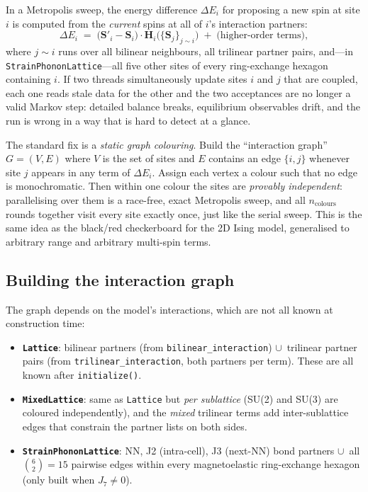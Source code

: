 \documentclass[11pt,letterpaper]{article}
\begin{document}
In a Metropolis sweep, the energy difference $\Delta E_i$ for proposing
a new spin at site $i$ is computed from the \emph{current} spins at all
of $i$'s interaction partners:
\[
\Delta E_i \;=\; \big(\mathbf{S}'_i - \mathbf{S}_i\big)\cdot
                 \mathbf{H}_i\big(\{\mathbf{S}_j\}_{j\sim i}\big)
              \;+\; \text{(higher-order terms)},
\]
where $j \sim i$ runs over all bilinear neighbours, all trilinear
partner pairs, and---in \texttt{StrainPhononLattice}---all five other
sites of every ring-exchange hexagon containing $i$.  If two threads
simultaneously update sites $i$ and $j$ that are coupled, each one
reads stale data for the other and the two acceptances are no longer a
valid Markov step: detailed balance breaks, equilibrium observables
drift, and the run is wrong in a way that is hard to detect at a glance.

The standard fix is a \emph{static graph colouring}.  Build the
``interaction graph'' $G = (V, E)$ where $V$ is the set of sites and
$E$ contains an edge $\{i, j\}$ whenever site $j$ appears in any term
of $\Delta E_i$.  Assign each vertex a colour such that no edge is
monochromatic.  Then within one colour the sites are \emph{provably
independent}: parallelising over them is a race-free, exact Metropolis
sweep, and all $n_{\text{colours}}$ rounds together visit every site
exactly once, just like the serial sweep.  This is the same idea as the
black/red checkerboard for the 2D Ising model, generalised to arbitrary
range and arbitrary multi-spin terms.

\subsection{Building the interaction graph}

The graph depends on the model's interactions, which are not all known
at construction time:

\begin{itemize}[noitemsep]
  \item \textbf{\texttt{Lattice}}:
        bilinear partners (from \texttt{bilinear\_interaction})
        $\cup$~trilinear partner pairs (from
        \texttt{trilinear\_interaction}, both partners per term).
        These are all known after \texttt{initialize()}.
  \item \textbf{\texttt{MixedLattice}}:
        same as \texttt{Lattice} but \emph{per sublattice}
        (SU(2) and SU(3) are coloured independently), and the
        \emph{mixed} trilinear terms add inter-sublattice edges that
        constrain the partner lists on both sides.
  \item \textbf{\texttt{StrainPhononLattice}}:
        NN, J2 (intra-cell), J3 (next-NN) bond partners
        $\cup$~all $\binom{6}{2} = 15$ pairwise edges within every
        magnetoelastic ring-exchange hexagon (only built when
        $J_{7} \neq 0$).
\end{itemize}
\end{document}
